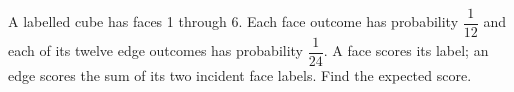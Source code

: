 A labelled cube has faces 1 through 6. Each face outcome has probability $\dfrac{1}{12}$ and each of its twelve edge outcomes has probability $\dfrac{1}{24}$. A face scores its label; an edge scores the sum of its two incident face labels. Find the expected score.
